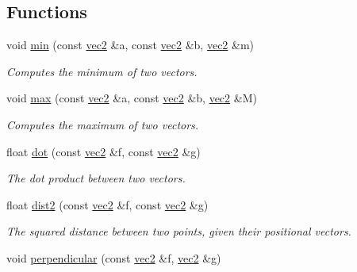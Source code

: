 \subsection*{Functions}
\begin{DoxyCompactItemize}
\item 
void \hyperlink{namespacephysim_1_1math_a35252bcade59c97ebc060a98fbb8a2b7}{min} (const \hyperlink{structphysim_1_1math_1_1vec2}{vec2} \&a, const \hyperlink{structphysim_1_1math_1_1vec2}{vec2} \&b, \hyperlink{structphysim_1_1math_1_1vec2}{vec2} \&m)
\begin{DoxyCompactList}\small\item\em Computes the minimum of two vectors. \end{DoxyCompactList}\item 
void \hyperlink{namespacephysim_1_1math_a7398ab5056daf695a7a09614d7953c26}{max} (const \hyperlink{structphysim_1_1math_1_1vec2}{vec2} \&a, const \hyperlink{structphysim_1_1math_1_1vec2}{vec2} \&b, \hyperlink{structphysim_1_1math_1_1vec2}{vec2} \&M)
\begin{DoxyCompactList}\small\item\em Computes the maximum of two vectors. \end{DoxyCompactList}\item 
\mbox{\label{namespacephysim_1_1math_aa83badac9152442c475f8080b844bc48}} 
float \hyperlink{namespacephysim_1_1math_aa83badac9152442c475f8080b844bc48}{dot} (const \hyperlink{structphysim_1_1math_1_1vec2}{vec2} \&f, const \hyperlink{structphysim_1_1math_1_1vec2}{vec2} \&g)
\begin{DoxyCompactList}\small\item\em The dot product between two vectors. \end{DoxyCompactList}\item 
\mbox{\label{namespacephysim_1_1math_a90a72aec2c53b1e7bd9d40a981dc3eef}} 
float \hyperlink{namespacephysim_1_1math_a90a72aec2c53b1e7bd9d40a981dc3eef}{dist2} (const \hyperlink{structphysim_1_1math_1_1vec2}{vec2} \&f, const \hyperlink{structphysim_1_1math_1_1vec2}{vec2} \&g)
\begin{DoxyCompactList}\small\item\em The squared distance between two points, given their positional vectors. \end{DoxyCompactList}\item 
void \hyperlink{namespacephysim_1_1math_af0c0f930df35414c901dbf366e03ec31}{perpendicular} (const \hyperlink{structphysim_1_1math_1_1vec2}{vec2} \&f, \hyperlink{structphysim_1_1math_1_1vec2}{vec2} \&g)

\end{DoxyCompactItemize}
